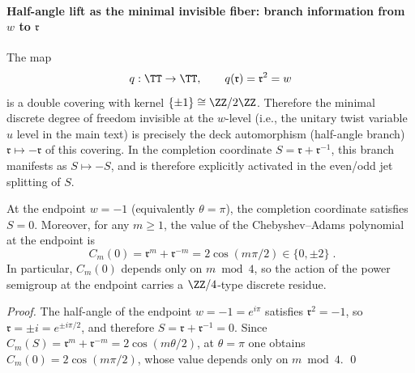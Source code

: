 \paragraph{Half-angle lift as the minimal invisible fiber: branch information from \(w\) to \(\mathfrak{r}\)}
The map
\[
q:\TT\to\TT,\qquad q(\mathfrak{r})=\mathfrak{r}^{2}=w
\]
is a double covering with kernel \(\{\pm 1\}\cong \ZZ/2\ZZ\).
Therefore the minimal discrete degree of freedom invisible at the \(w\)-level (i.e., the unitary twist variable \(u\) level in the main text) is precisely the deck automorphism (half-angle branch) \(\mathfrak{r}\mapsto-\mathfrak{r}\) of this covering.
In the completion coordinate \(S=\mathfrak{r}+\mathfrak{r}^{-1}\), this branch manifests as
\(
S\mapsto -S
\), and is therefore explicitly activated in the even/odd jet splitting of \(S\).

\begin{proposition}[Half-angle residue at the endpoint \texorpdfstring{$w=-1$}{w=-1} and \texorpdfstring{$\ZZ/4$}{Z/4}-type values]\label{prop:half-angle-z4-residue}
At the endpoint \(w=-1\) (equivalently \(\theta=\pi\)), the completion coordinate satisfies \(S=0\).
Moreover, for any \(m\ge 1\), the value of the Chebyshev--Adams polynomial at the endpoint is
\begin{equation}\label{eq:chebyshev-endpoint-values}
\boxed{\;
C_m(0)=\mathfrak{r}^{m}+\mathfrak{r}^{-m}=2\cos(m\pi/2)\in\{0,\pm 2\}\; }.
\end{equation}
In particular, \(C_m(0)\) depends only on \(m\bmod 4\), so the action of the power semigroup at the endpoint carries a \(\ZZ/4\)-type discrete residue.
\end{proposition}
\begin{proof}
The half-angle of the endpoint \(w=-1=e^{i\pi}\) satisfies \(\mathfrak{r}^{2}=-1\), so \(\mathfrak{r}=\pm i=e^{\pm i\pi/2}\), and therefore \(S=\mathfrak{r}+\mathfrak{r}^{-1}=0\).
Since \(C_m(S)=\mathfrak{r}^m+\mathfrak{r}^{-m}=2\cos(m\theta/2)\), at \(\theta=\pi\) one obtains
\(
C_m(0)=2\cos(m\pi/2)
\), whose value depends only on \(m\bmod 4\). \qed
\end{proof}

